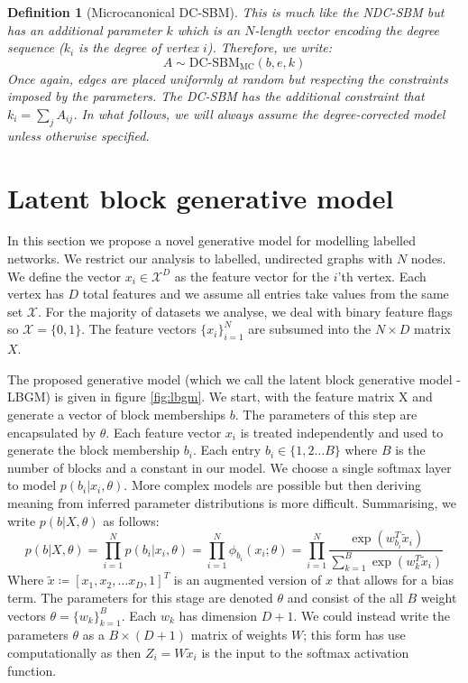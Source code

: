 \documentclass{article}
\newcommand{\Xcal}{\mathcal{X}}
\newtheorem{definition}{Definition}[section]
\begin{document}
\begin{definition}[Microcanonical DC-SBM]
	\label{defn:microcan-dc-sbm}
	This is much like the NDC-SBM but has an additional parameter $k$ which is an $N$-length vector encoding the degree sequence ($k_i$ is the degree of vertex $i$). Therefore, we write:
	\begin{equation}
		A \sim \textrm{DC-SBM}_{\textrm{MC}} (b, e, k)
	\end{equation}
	Once again, edges are placed uniformly at random but respecting the constraints imposed by the parameters. The DC-SBM has the additional constraint that $k_i = \sum_{j} A_{ij}$. In what follows, we will always assume the degree-corrected model unless otherwise specified.
	
\end{definition}


\section{Latent block generative model}

In this section we propose a novel generative model for modelling labelled networks. We restrict our analysis to labelled, undirected graphs with $N$ nodes. We define the vector $x_i \in \Xcal^D$ as the feature vector for the $i$'th vertex. Each vertex has $D$ total features and we assume all entries take values from the same set $\Xcal$. For the majority of datasets we analyse, we deal with binary feature flags so $\Xcal = \{0, 1\}$. The feature vectors $\{x_i\}_{i=1}^{N}$ are subsumed into the $N \times D$ matrix $X$.

The proposed generative model (which we call the latent block generative model - LBGM) is given in figure \ref{fig:lbgm}. We start, with the feature matrix X and generate a vector of block memberships $b$. The parameters of this step are encapsulated by $\theta$. Each feature vector $x_i$ is treated independently and used to generate the block membership $b_i$. Each entry $b_i \in \{1, 2 \dots B\}$ where $B$ is the number of blocks and a constant in our model. We choose a single softmax layer to model $p(b_i | x_i, \theta)$. More complex models are possible but then deriving meaning from inferred parameter distributions is more difficult. Summarising, we write $p(b | X, \theta)$ as follows:
%
\begin{equation}
	p(b| X, \theta) = \prod_{i=1}^{N} p(b_i | x_i, \theta) = \prod_{i=1}^{N} \phi_{b_i} (x_i; \theta)
	= \prod_{i=1}^{N} \frac{\exp\left(w_{b_i}^T \tilde{x}_i\right)}{\sum_{k=1}^{B} \exp \left( w_k^T \tilde{x}_i\right)}
\end{equation}
%
Where $\tilde{x} \coloneqq \left[x_1, x_2, \dots x_D, 1\right]^T$ is an augmented version of $x$ that allows for a bias term. The parameters for this stage are denoted $\theta$ and consist of the all $B$ weight vectors $\theta = \{w_k\}_{k=1}^{B}$. Each $w_k$ has dimension $D+1$. We could instead write the parameters $\theta$ as a $B \times (D+1)$ matrix of weights $W$; this form has use computationally as then $Z_i = W \tilde{x}_i$ is the input to the softmax activation function.
\end{document}
